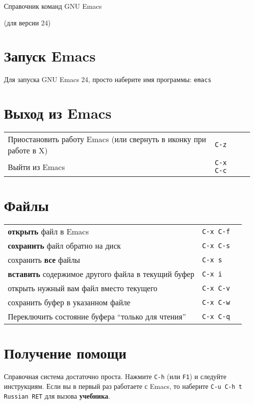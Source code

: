 \documentclass[10pt]{article}
\newlength{\ColWidth}
\newlength{\ColThreeWidth}
\newcommand{\versionemacs}[0]{24} %
\newcommand{\kbd}[1]{\texttt{#1}}
\begin{document}

\centerline{Справочник команд GNU Emacs}
\centerline{(для версии \versionemacs)}

\section{Запуск Emacs}

Для запуска GNU Emacs \versionemacs, просто наберите имя программы: \kbd{emacs}

\section{Выход из Emacs}

\begin{tabular}{p{\ColWidth}p{\ColThreeWidth}p{\ColThreeWidth}}
Приостановить работу Emacs (или свернуть в иконку при работе в X) & \kbd{C-z} \\
Выйти из Emacs & \kbd{C-x C-c} \\
\end{tabular}

\section{Файлы}

\begin{tabular}{p{\ColWidth}p{\ColThreeWidth}p{\ColThreeWidth}}
{\bf открыть} файл в Emacs & \kbd{C-x C-f} \\
{\bf сохранить} файл обратно на диск & \kbd{C-x C-s} \\
сохранить {\bf все} файлы & \kbd{C-x s} \\
{\bf вставить} содержимое другого файла в текущий буфер & \kbd{C-x i} \\
открыть нужный вам файл вместо текущего & \kbd{C-x C-v} \\
сохранить буфер в указанном файле & \kbd{C-x C-w} \\
Переключить состояние буфера ``только для чтения'' & \kbd{C-x C-q} \\
\end{tabular}

\section{Получение помощи}

Справочная система достаточно проста. Hажмите \kbd{C-h} (или \kbd{F1}) и
следуйте инструкциям.  Если вы в первый раз работаете с Emacs, то наберите
\kbd{C-u C-h t Russian RET} для вызова {\bf учебника}.
\end{document}
